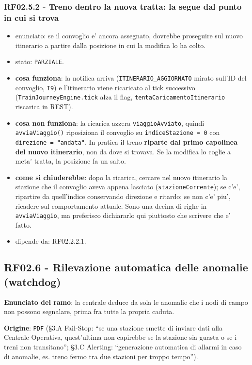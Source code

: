 \documentclass[11pt]{article}
\begin{document}
\subsubsection{RF02.5.2 - Treno \textbf{dentro} la nuova tratta: la segue dal punto in cui si trova}
\label{sec:org0bf6e2e}
\begin{itemize}
\item enunciato: se il convoglio e' ancora assegnato, dovrebbe proseguire sul nuovo itinerario a partire
dalla posizione in cui la modifica lo ha colto.
\item stato: \texttt{PARZIALE}.
\item \textbf{cosa funziona}: la notifica arriva (\texttt{ITINERARIO\_AGGIORNATO} mirato sull'ID del convoglio, \texttt{T9}) e
l'itinerario viene ricaricato al tick successivo (\texttt{TrainJourneyEngine.tick} alza il flag,
\texttt{tentaCaricamentoItinerario} riscarica in REST).
\item \textbf{cosa non funziona}: la ricarica azzera \texttt{viaggioAvviato}, quindi \texttt{avviaViaggio()} riposiziona il
convoglio su \texttt{indiceStazione = 0} con \texttt{direzione = "andata"}. In pratica il treno \textbf{riparte dal
primo capolinea del nuovo itinerario}, non da dove si trovava. Se la modifica lo coglie a meta'
tratta, la posizione fa un salto.
\item \textbf{come si chiuderebbe}: dopo la ricarica, cercare nel nuovo itinerario la stazione che il convoglio
aveva appena lasciato (\texttt{stazioneCorrente}); se c'e', ripartire da quell'indice conservando
direzione e ritardo; se non c'e' piu', ricadere sul comportamento attuale. Sono una decina di
righe in \texttt{avviaViaggio}, ma preferisco dichiararlo qui piuttosto che scrivere che e' fatto.
\item dipende da: RF02.2.2.1.
\end{itemize}
\subsection{RF02.6 - Rilevazione automatica delle anomalie (watchdog)}
\label{sec:org4cd37d3}

\textbf{Enunciato del ramo}: la centrale deduce da sola le anomalie che i nodi di campo non possono
segnalare, prima fra tutte la propria caduta.

\textbf{Origine}: \texttt{PDF} (§3.A Fail-Stop: ``se una stazione smette di inviare dati alla Centrale Operativa,
quest'ultima non capirebbe se la stazione sia guasta o se i treni non transitano''; §3.C Alerting:
``generazione automatica di allarmi in caso di anomalie, es. treno fermo tra due stazioni per troppo
tempo'').
\end{document}
